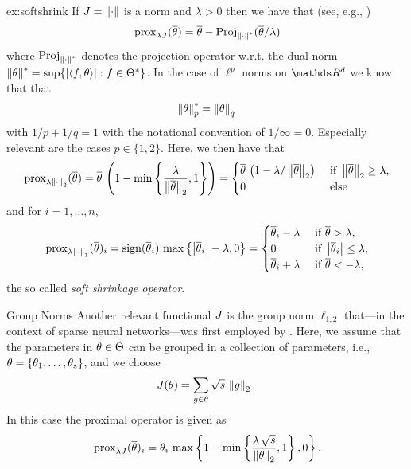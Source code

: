 \begin{example}{}{ex:softshrink}
If $J=\left\|\cdot\right\|$ is a norm and $\lambda>0$ then we have that (see, e.g., \cite{parikh2014proximal})
%
\begin{align*}
\,\mathrm{prox}_{\lambda J}(\overline\theta) = 
\overline\theta - \operatorname{Proj}_{\left\|\cdot\right\|^\ast}(\overline\theta/\lambda)
\end{align*}
%
where $\operatorname{Proj}_{\left\|\cdot\right\|^\ast}$ denotes the projection operator w.r.t. the dual norm $\left\|\theta\right\|^\ast = \sup\{\left|\langle f , \theta\rangle\right|: f\in\Theta^\ast\}$. In the case of $\ell^p$ norms on $\R^d$ we know that that 
%
\begin{align*}
\left\|\theta\right\|_p^\ast = \left\|\theta\right\|_q
\end{align*}
%
with $1/p + 1/q = 1$ with the notational convention of $1/\infty=0$. Especially relevant are the cases $p\in\{1,2\}$. Here, we then have that
%
\begin{align*}
\prox{\lambda\norm{\cdot}_2}(\pparam) = 
%
\pparam\,\left(1 - \min\left\{\frac{\lambda}{\norm{\pparam}_2}, 1\right\}\right)=
%
\begin{cases}
\pparam\,\left(1 - \lambda/\norm{\pparam}_2\right) &\text{ if } \norm{\pparam}_2 \geq \lambda,\\
0 &\text{ else}
\end{cases}
\end{align*}
%
and for $i=1,\ldots,n$,
%
\begin{align*}
\prox{\lambda\norm{\cdot}_1}(\pparam)_i
%
= \sign(\pparam_i)\, \max\left\{\abs{\pparam_i} - \lambda, 0\right\} =
%
\begin{cases}
\pparam_i -\lambda &\text{ if }\pparam > \lambda,\\
0 &\text{ if } \abs{\pparam_i}\leq \lambda,\\
\pparam_i +\lambda &\text{ if }\pparam < -\lambda,
\end{cases}
\end{align*}
%
the so called \emph{soft shrinkage operator}. 
\end{example}
%
%
\begin{example}{Group Norms}{}
Another relevant functional $J$ is the group norm $\ell_{1,2}$ that---in the context of sparse neural networks---was first employed by \cite{scardapane2017group}. Here, we assume that the parameters in $\theta\in\Theta$ can be grouped in a collection of parameters, i.e., $\theta=\{\theta_1,\ldots, \theta_s\}$, and we choose
%
\begin{align*}
J(\theta) = \sum_{g\in\theta} \sqrt{s}\, \left\|g\right\|_2.
\end{align*}
%
In this case the proximal operator is given as
%
\begin{align*}
\,\mathrm{prox}_{\lambda J}(\overline\theta)_i = \theta_i \, 
\max\left\{1- \min\left\{
\frac{\lambda\,\sqrt{s}}{\left\|\theta\right\|_2}
,1 \right\}
,0\right\}.
\end{align*}
\end{example}

